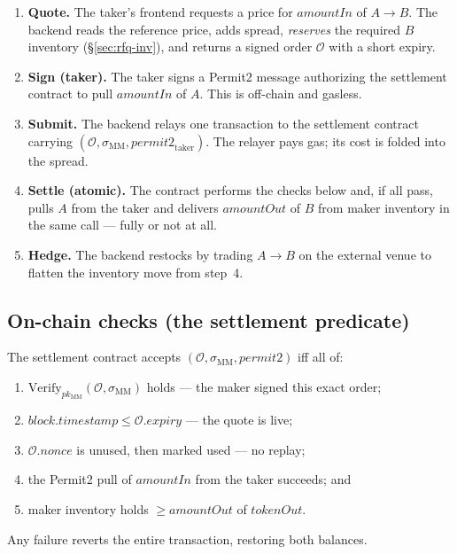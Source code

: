 \begin{enumerate}
  \item \textbf{Quote.} The taker's frontend requests a price for
  $\mathit{amountIn}$ of $A\to B$. The backend reads the reference
  price, adds spread, \emph{reserves} the required $B$ inventory
  (\S\ref{sec:rfq-inv}), and returns a signed order $\mathcal{O}$ with a
  short expiry.

  \item \textbf{Sign (taker).} The taker signs a Permit2 message
  authorizing the settlement contract to pull $\mathit{amountIn}$ of
  $A$. This is off-chain and gasless.

  \item \textbf{Submit.} The backend relays one transaction to the
  settlement contract carrying $(\mathcal{O}, \sigma_{\mathrm{MM}},
  \mathit{permit2}_{\mathrm{taker}})$. The relayer pays gas; its cost is
  folded into the spread.

  \item \textbf{Settle (atomic).} The contract performs the checks
  below and, if all pass, pulls $A$ from the taker and delivers
  $\mathit{amountOut}$ of $B$ from maker inventory in the same call ---
  fully or not at all.

  \item \textbf{Hedge.} The backend restocks by trading $A\to B$ on the
  external venue to flatten the inventory move from step~4.
\end{enumerate}

\subsection{On-chain checks (the settlement predicate)}

The settlement contract accepts $(\mathcal{O}, \sigma_{\mathrm{MM}},
\mathit{permit2})$ iff all of:
\begin{enumerate}[label=(C\arabic*),leftmargin=3.2em]
  \item $\mathrm{Verify}_{pk_{\mathrm{MM}}}(\mathcal{O},
  \sigma_{\mathrm{MM}})$ holds --- the maker signed this exact order;
  \item $\mathit{block.timestamp} \le \mathcal{O}.\mathit{expiry}$ ---
  the quote is live;
  \item $\mathcal{O}.\mathit{nonce}$ is unused, then marked used ---
  no replay;
  \item the Permit2 pull of $\mathit{amountIn}$ from the taker
  succeeds; and
  \item maker inventory holds $\ge \mathit{amountOut}$ of
  $\mathit{tokenOut}$.
\end{enumerate}
Any failure reverts the entire transaction, restoring both balances.

